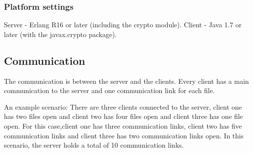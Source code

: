 \subsubsection{Platform settings}

Server - Erlang R16 or later (including the crypto module). 
Client - Java 1.7 or later (with the javax.crypto package). 


\subsection{Communication}

The communication is between the server and the clients. Every client has a main communication to the server and one communication link for each file. 

An example scenario: There are three clients connected to the server, client one has two files open and client two has four files open and client three has one file open. For this case,client one has three communication links, client two has five communication links and client three has two communication links open. In this scenario, the server holds a total of 10 communication links.

